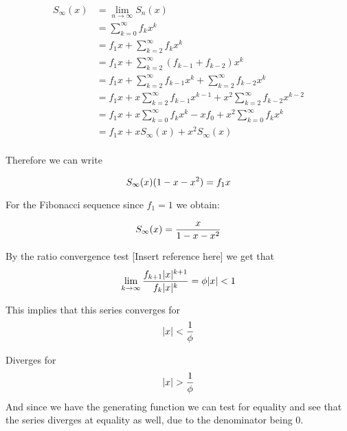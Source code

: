 \documentclass[a4paper]{article}
\begin{document}
\begin{equation}
\begin{split}
S_{\infty}(x) & = \lim_{n \to \infty} S_n(x) \\
 & = \sum_{k=0}^{\infty} f_k x^k \\
 & = f_1 x + \sum_{k=2}^{\infty} f_k x^k \\
 & = f_1 x + \sum_{k=2}^{\infty} (f_{k-1} + f_{k-2}) x^k \\
 & = f_1 x + \sum_{k=2}^{\infty} f_{k-1} x^k + \sum_{k=2}^{\infty} f_{k-2} x^k \\
  & = f_1 x + x \sum_{k=2}^{\infty} f_{k-1} x^{k-1} + x^2 \sum_{k=2}^{\infty} f_{k-2} x^{k-2} \\
  & = f_1 x + x \sum_{k=0}^{\infty} f_{k} x^{k} - x f_0 + x^2 \sum_{k=0}^{\infty} f_{k} x^{k} \\
  & = f_1 x + x S_{\infty}(x) + x^2 S_{\infty}(x) \\
\end{split}\label{eq:equation15}
\end{equation}

Therefore we can write

\begin{equation}
S_{\infty}(x) (1 - x -x^2 ) = f_1 x \\
\label{eq:equation16}
\end{equation}

For the Fibonacci sequence since $f_1 = 1$ we obtain:

\begin{equation}
S_{\infty}(x) = \frac{x}{1 - x -x^2 }  \\
\label{eq:equation17}
\end{equation}

By the ratio convergence test [Insert reference here]
we get that
\begin{equation}
\lim_{k \to
\infty} \frac{f_{k+1} |x|^{k+1}}{f_{k} |x|^{k}} = \phi |x| < 1 \\
\label{eq:equation18}
\end{equation}

This implies that this series converges for
\begin{equation}
|x| < \frac{1}{\phi} \\
\label{eq:equation19}
\end{equation}

Diverges for
\begin{equation}
|x| > \frac{1}{\phi} \\
\label{eq:equation20}
\end{equation}
And since we have the generating function we can test for equality and see that the series diverges at equality as well, due to the denominator being 0.
\end{document}
